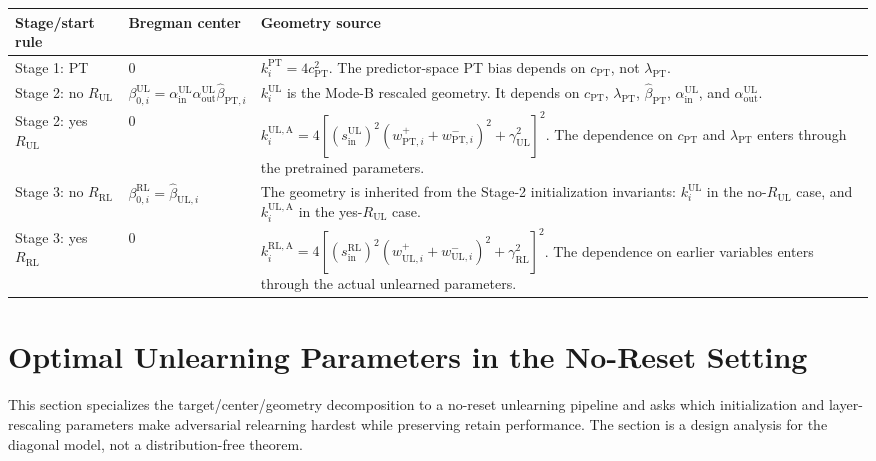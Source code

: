 \documentclass[11pt]{article}
\begin{document}
\begin{center}
\small
\begin{tabular}{p{}p{}p{}}
\toprule
\textbf{Stage/start rule} & \textbf{Bregman center} & \textbf{Geometry source} \\
\midrule
Stage 1: PT
&
\(0\)
&
\(k_i^{\mathrm{PT}}=4c_{\mathrm{PT}}^2\).  The predictor-space PT bias depends on \(c_{\mathrm{PT}}\), not \(\lambda_{\mathrm{PT}}\).
\\
\addlinespace
Stage 2: no \(R_{\mathrm{UL}}\)
&
\(\beta_{0,i}^{\mathrm{UL}}=\alpha_{\mathrm{in}}^{\mathrm{UL}}\alpha_{\mathrm{out}}^{\mathrm{UL}}\widehat\beta_{\mathrm{PT},i}\)
&
\(k_i^{\mathrm{UL}}\) is the Mode-B rescaled geometry.  It depends on \(c_{\mathrm{PT}}\), \(\lambda_{\mathrm{PT}}\), \(\widehat\beta_{\mathrm{PT}}\), \(\alpha_{\mathrm{in}}^{\mathrm{UL}}\), and \(\alpha_{\mathrm{out}}^{\mathrm{UL}}\).
\\
\addlinespace
Stage 2: yes \(R_{\mathrm{UL}}\)
&
\(0\)
&
\(k_i^{\mathrm{UL,A}}=4[(s_{\mathrm{in}}^{\mathrm{UL}})^2(w_{\mathrm{PT},i}^{+}+w_{\mathrm{PT},i}^{-})^2+\gamma_{\mathrm{UL}}^2]^2\).  The dependence on \(c_{\mathrm{PT}}\) and \(\lambda_{\mathrm{PT}}\) enters through the pretrained parameters.
\\
\addlinespace
Stage 3: no \(R_{\mathrm{RL}}\)
&
\(\beta_{0,i}^{\mathrm{RL}}=\widehat\beta_{\mathrm{UL},i}\)
&
The geometry is inherited from the Stage-2 initialization invariants: \(k_i^{\mathrm{UL}}\) in the no-\(R_{\mathrm{UL}}\) case, and \(k_i^{\mathrm{UL,A}}\) in the yes-\(R_{\mathrm{UL}}\) case.
\\
\addlinespace
Stage 3: yes \(R_{\mathrm{RL}}\)
&
\(0\)
&
\(k_i^{\mathrm{RL,A}}=4[(s_{\mathrm{in}}^{\mathrm{RL}})^2(w_{\mathrm{UL},i}^{+}+w_{\mathrm{UL},i}^{-})^2+\gamma_{\mathrm{RL}}^2]^2\).  The dependence on earlier variables enters through the actual unlearned parameters.
\\
\bottomrule
\end{tabular}
\end{center}


\section{Optimal Unlearning Parameters in the No-Reset Setting}

This section specializes the target/center/geometry decomposition to a no-reset unlearning pipeline and asks which initialization and layer-rescaling parameters make adversarial relearning hardest while preserving retain performance. The section is a design analysis for the diagonal model, not a distribution-free theorem.
\end{document}
